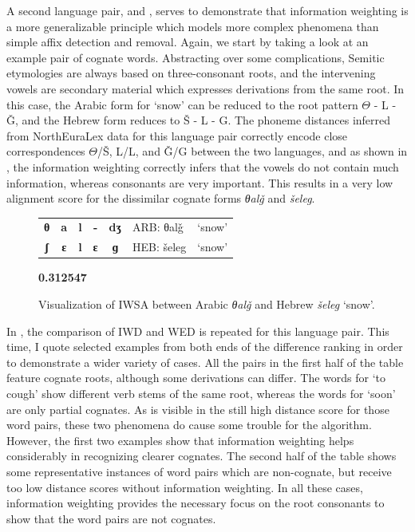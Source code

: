 A second language pair,  and , serves to demonstrate that information weighting is a more generalizable principle which models more complex phenomena than simple affix detection and removal. Again, we start by taking a look at an example pair of cognate words. Abstracting over some complications, Semitic etymologies are always based on three-consonant roots, and the intervening vowels are secondary material which expresses derivations from the same root. In this case, the Arabic form for `snow' can be reduced to the root pattern $\Theta$ - L - Ǧ, and the Hebrew form reduces to Š - L - G. The phoneme distances inferred from NorthEuraLex data for this language pair correctly encode close correspondences $\Theta$/Š, L/L, and Ǧ/G between the two languages, and as shown in , the information weighting correctly infers that the vowels do not contain much information, whereas consonants are very important. This results in a very low alignment score for the dissimilar cognate forms \textit{θalǧ} and \textit{šeleg}.

\begin{figure}
\centering
\setlength\tabcolsep{0.1cm}
\begin{tabular}{cccccll}
\hline
{\color[rgb]{0.043,0.714,0.043} \textbf{θ}} & {\color[rgb]{0.729,0.608,0.490} \textbf{a}} & {\color[rgb]{0.188,0.710,0.153} \textbf{l}} & {\color[rgb]{0.722,0.533,0.427} \textbf{-}} & {\color[rgb]{0.278,0.475,0.043} \textbf{dʒ}} & ARB: θalǧ & `snow'\\
{\color[rgb]{0.082,0.725,0.082} \textbf{ʃ}} & {\color[rgb]{0.729,0.608,0.490} \textbf{ɛ}} & {\color[rgb]{0.271,0.737,0.239} \textbf{l}} & {\color[rgb]{0.722,0.533,0.427} \textbf{ɛ}} & {\color[rgb]{0.329,0.514,0.110} \textbf{ɡ}} & HEB: šeleg &  `snow'\\ \hline
\end{tabular}
{\color[rgb]{0.220,0.482,0.000} \textbf{0.312547}}\\
\caption{Visualization of IWSA between Arabic \textit{θalǧ} and Hebrew \textit{šeleg} `snow'.}
\label{iwsa-example-arb-heb}
\end{figure}

In , the comparison of IWD and WED is repeated for this language pair. This time, I quote selected examples from both ends of the difference ranking in order to demonstrate a wider variety of cases. All the pairs in the first half of the table feature cognate roots, although some derivations can differ. The words for `to cough' show different verb stems of the same root, whereas the words for `soon' are only partial cognates. As is visible in the still high distance score for those word pairs, these two phenomena do cause some trouble for the algorithm. However, the first two examples show that information weighting helps considerably in recognizing clearer cognates. The second half of the table shows some representative instances of word pairs which are non-cognate, but receive too low distance scores without information weighting. In all these cases, information weighting provides the necessary focus on the root consonants to show that the word pairs are not cognates.


